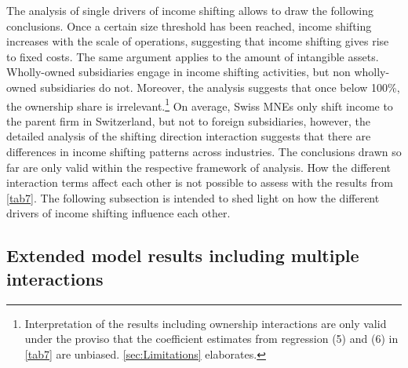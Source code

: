\documentclass[10pt,twocolumn,oneside,cmyk]{article}
\begin{document}
The analysis of single drivers of income shifting allows to draw the following conclusions. Once a certain size threshold has been reached, income shifting increases with the scale of operations, suggesting that income shifting gives rise to fixed costs. The same argument applies to the amount of intangible assets. Wholly-owned subsidiaries engage in income shifting activities, but non wholly-owned subsidiaries do not. Moreover, the analysis suggests that once below 100\%, the ownership share is irrelevant.\footnote{Interpretation of the results including ownership interactions are only valid under the proviso that the coefficient estimates from regression (5) and (6) in \cref{tab7} are unbiased. \cref{sec:Limitations} elaborates.} On average, Swiss MNEs only shift income to the parent firm in Switzerland, but not to foreign subsidiaries, however, the detailed analysis of the shifting direction interaction suggests that there are differences in income shifting patterns across industries. The conclusions drawn so far are only valid within the respective framework of analysis. How the different interaction terms affect each other is not possible to assess with the results from \cref{tab7}. The following subsection is intended to shed light on how the different drivers of income shifting influence each other.

\subsection{Extended model results including multiple interactions} \label{sec:Extended model results including multiple interactions}
\end{document}
